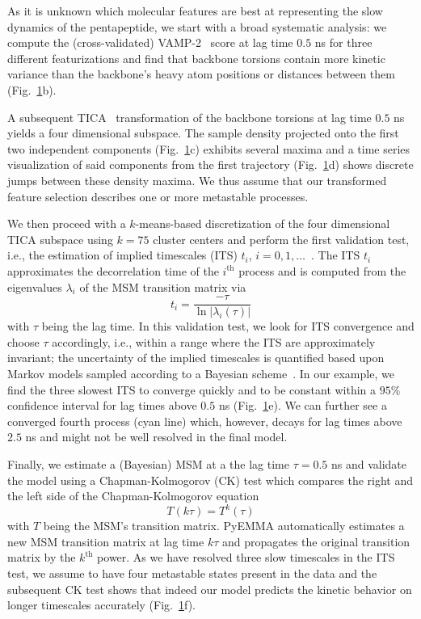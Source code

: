 \documentclass[9pt,tutorial]{livecoms}
\begin{document}
\begin{figure}
\label{fig:io-to-ck}
\end{figure}

As it is unknown which molecular features are best at representing the slow dynamics of the pentapeptide, we start with a broad systematic analysis: we compute the (cross-validated) VAMP-2~\cite{vamp-preprint} score at lag time $0.5$ ns for three different featurizations and find that backbone torsions contain more kinetic variance than the backbone's heavy atom positions or distances between them (Fig.~\ref{fig:io-to-ck}b).

A subsequent TICA~\cite{tica,kinetic-maps} transformation of the backbone torsions at lag time $0.5$ ns yields a four dimensional subspace. The sample density projected onto the first two independent components (Fig.~\ref{fig:io-to-ck}c) exhibits several maxima and a time series visualization of said components from the first trajectory (Fig.~\ref{fig:io-to-ck}d) shows discrete jumps between these density maxima. We thus assume that our transformed feature selection describes one or more metastable processes.

We then proceed with a $k$-means-based discretization of the four dimensional TICA subspace using $k=75$ cluster centers and perform the first validation test, i.e., the estimation of implied timescales (ITS) $t_i$, $i=0, 1,\dots$~\cite{swope-its}. The ITS $t_i$ approximates the decorrelation time of the $i^\textrm{th}$ process and is computed from the eigenvalues $\lambda_i$ of the MSM transition matrix via
\begin{equation}
\label{eq:its}
t_i = \frac{-\tau}{\ln\left|\lambda_i(\tau)\right|}
\end{equation}
with $\tau$ being the lag time. In this validation test, we look for ITS convergence and choose $\tau$ accordingly, i.e., within a range where the ITS are approximately invariant; the uncertainty of the implied timescales is quantified based upon Markov models sampled according to a Bayesian scheme~\cite{noe-tmat-sampling}. In our example, we find the three slowest ITS to converge quickly and to be constant within a $95\%$ confidence interval for lag times above $0.5$ ns (Fig.~\ref{fig:io-to-ck}e). We can further see a converged fourth process (cyan line) which, however, decays for lag times above $2.5$ ns and might not be well resolved in the final model.

Finally, we estimate a (Bayesian) MSM at a the lag time $\tau=0.5$ ns and validate the model using a Chapman-Kolmogorov (CK) test which compares the right and the left side of the Chapman-Kolmogorov equation
\begin{equation}
\label{eq:ck}
T(k \tau) = T^k(\tau)
\end{equation}
with $T$ being the MSM's transition matrix. PyEMMA automatically estimates a new MSM transition matrix at lag time $k \tau$ and propagates the original transition matrix by the $k^\textrm{th}$ power. As we have resolved three slow timescales in the ITS test, we assume to have four metastable states present in the data and the subsequent CK test shows that indeed our model predicts the kinetic behavior on longer timescales accurately (Fig.~\ref{fig:io-to-ck}f).
\end{document}
